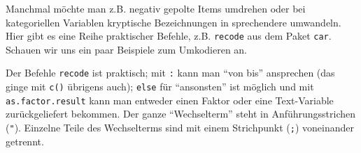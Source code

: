 \documentclass[12pt,ngerman,]{book}
\makeatletter
\newenvironment{Shaded}{\begin{snugshade}}{\end{snugshade}}
\newcommand{\KeywordTok}[1]{\textcolor[rgb]{0.13,0.29,0.53}{\textbf{#1}}}
\newcommand{\DataTypeTok}[1]{\textcolor[rgb]{0.13,0.29,0.53}{#1}}
\newcommand{\DecValTok}[1]{\textcolor[rgb]{0.00,0.00,0.81}{#1}}
\newcommand{\StringTok}[1]{\textcolor[rgb]{0.31,0.60,0.02}{#1}}
\newcommand{\CommentTok}[1]{\textcolor[rgb]{0.56,0.35,0.01}{\textit{#1}}}
\newcommand{\OtherTok}[1]{\textcolor[rgb]{0.56,0.35,0.01}{#1}}
\newcommand{\OperatorTok}[1]{\textcolor[rgb]{0.81,0.36,0.00}{\textbf{#1}}}
\newcommand{\NormalTok}[1]{#1}
\newenvironment{kframe}{%
\medskip{}
\setlength{\fboxsep}{.8em}
 \def\at@end@of@kframe{}%
 \ifinner\ifhmode%
  \def\at@end@of@kframe{\end{minipage}}%
  \begin{minipage}{\columnwidth}%
 \fi\fi%
 \def\FrameCommand##1{\hskip\@totalleftmargin \hskip-\fboxsep
 \colorbox{shadecolor}{##1}\hskip-\fboxsep
     \hskip-\linewidth \hskip-\@totalleftmargin \hskip\columnwidth}%
 \MakeFramed {\advance\hsize-\width
   \@totalleftmargin\z@ \linewidth\hsize
   \@setminipage}}%
 {\par\unskip\endMakeFramed%
 \at@end@of@kframe}
\renewenvironment{Shaded}{\begin{kframe}}{\end{kframe}}
\theoremstyle{definition}
\theoremstyle{definition}
\theoremstyle{remark}
\makeatother
\begin{document}
Manchmal möchte man z.B. negativ gepolte Items umdrehen oder bei
kategoriellen Variablen kryptische Bezeichnungen in sprechendere
umwandeln. Hier gibt es eine Reihe praktischer Befehle, z.B.
\texttt{recode} aus dem Paket \texttt{car}. Schauen wir uns ein paar
Beispiele zum Umkodieren an.

\begin{Shaded}
\end{Shaded}

Der Befehle \texttt{recode} ist praktisch; mit \texttt{:} kann man ``von
bis'' ansprechen (das ginge mit \texttt{c()} übrigens auch);
\texttt{else} für ``ansonsten'' ist möglich und mit
\texttt{as.factor.result} kann man entweder einen Faktor oder eine
Text-Variable zurückgeliefert bekommen. Der ganze ``Wechselterm'' steht
in Anführungsstrichen (\texttt{"}). Einzelne Teile des Wechselterms sind
mit einem Strichpunkt (\texttt{;}) voneinander getrennt.
\end{document}
